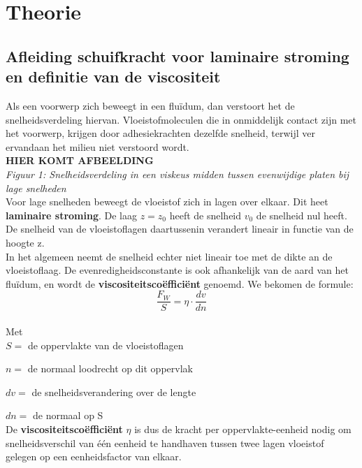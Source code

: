 \section{Theorie}

\subsection{Afleiding schuifkracht voor laminaire stroming en 
definitie van de viscositeit}

Als een voorwerp zich beweegt in een flu\"idum, dan verstoort het de snelheidsverdeling hiervan.
Vloeistofmoleculen die in onmiddelijk contact zijn met het voorwerp, krijgen door 
adhesiekrachten dezelfde snelheid, terwijl ver ervandaan het milieu niet verstoord wordt.\\

\textbf{HIER KOMT AFBEELDING}
\\

\textit{Figuur 1: Snelheidsverdeling in een viskeus midden tussen evenwijdige platen bij lage snelheden}\\

Voor lage snelheden beweegt de vloeistof zich in lagen over elkaar. Dit heet \textbf{laminaire stroming}.
De laag $z = z_{0}$ heeft de snelheid $v_{0}$ de snelheid nul heeft. De snelheid van de 
vloeistoflagen daartussenin verandert lineair in functie van de hoogte z.
\\

In het algemeen neemt de snelheid echter niet lineair toe met de dikte an de vloeistoflaag. 
De evenredigheidsconstante is ook afhankelijk van de aard van het flu\"idum, en wordt de
\textbf{viscositeitsco\"effici\"ent} genoemd. We bekomen de formule:
\\

$$\frac{F_{W}}{S} = \eta \cdot \frac{dv}{dn}$$
\\

Met
\\

$S=$ de oppervlakte van de vloeistoflagen

$n=$ de normaal loodrecht op dit oppervlak

$dv=$ de snelheidsverandering over de lengte

$dn=$ de normaal op S
\\

De \textbf{viscositeitsco\"effici\"ent} $\eta$ is dus de kracht per oppervlakte-eenheid nodig 
om snelheidsverschil van \'e\'en eenheid te handhaven tussen twee lagen vloeistof gelegen 
op een eenheidsfactor van elkaar.

